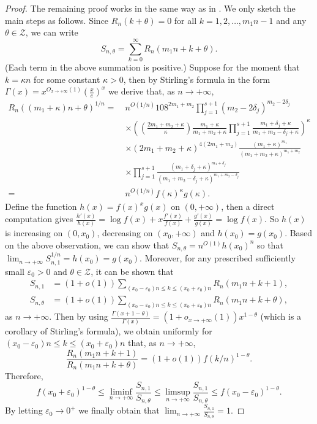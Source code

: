 \documentclass[11pt]{amsart}
\numberwithin{equation}{section}
\begin{document}
\begin{proof}
The remaining proof works in the same way as in \cite[Lemma~4.1]{LY20}. We only sketch the main steps as follows. Since $R_n(k+\theta) = 0$ for all $k=1,2,\ldots,m_{1}n-1$ and any $\theta \in \mathcal{Z}$, we can write
\[ S_{n,\theta} =  \sum_{k=0}^{\infty} R_n(m_1n+k+\theta). \]
(Each term in the above summation is positive.) Suppose for the moment that $k = \kappa n$ for some constant $\kappa > 0$, then by Stirling's formula in the form $\Gamma(x)=x^{O_{x \rightarrow+\infty}(1)}\left(\frac{x}{e}\right)^{x}$ we derive that, as $n \rightarrow +\infty$,
\begin{align*}
R_n\left( (m_1+\kappa)n+\theta \right)^{1/n} =~& n^{O(1/n)} 108^{2m_1+m_2} \prod_{j=1}^{s+1} (m_2-2\delta_j)^{m_2-2\delta_j} \\
&\times \left( \left( \frac{2m_1+m_2+\kappa}{\kappa} \right)\frac{m_1+\kappa}{m_1+m_2+\kappa} \prod_{j=1}^{s+1} \frac{m_1+\delta_j+\kappa}{m_1+m_2-\delta_j+\kappa}  \right)^{\kappa} \\
&\times (2m_1+m_2+\kappa)^{4(2m_1+m_2)}\frac{(m_1+\kappa)^{m_1}}{(m_1+m_2+\kappa)^{m_1+m_2}} \\
&\times \prod_{j=1}^{s+1}\frac{(m_1+\delta_j+\kappa)^{m_1+\delta_j}}{(m_1+m_2-\delta_j+\kappa)^{m_1+m_2-\delta_j}} \\
=~&n^{O(1/n)}f(\kappa)^{\kappa}g(\kappa).
\end{align*}
Define the function $h(x) = f(x)^{x}g(x)$ on $(0,+\infty)$, then a direct computation gives $\frac{h'(x)}{h(x)} = \log f(x) + x\frac{f'(x)}{f(x)} + \frac{g'(x)}{g(x)} = \log f(x)$. So $h(x)$ is increasing on $(0,x_0)$, decreasing on $(x_0,+\infty)$ and $h(x_0)=g(x_0)$. Based on the above observation, we can show that $S_{n,\theta} = n^{O(1)}h(x_0)^n$ so that $\lim_{n \rightarrow +\infty} S_{n,1}^{1/n} = h(x_0) = g(x_0)$. Moreover, for any prescribed sufficiently small $\varepsilon_0 > 0$ and $\theta \in \mathcal{Z}$, it can be shown that
\begin{align*}
S_{n,1} &= (1+o(1))\sum_{(x_0-\varepsilon_0)n \leqslant k \leqslant (x_0+\varepsilon_0)n} R_n(m_1n+k+1),  \\
S_{n,\theta} &= (1+o(1))\sum_{(x_0-\varepsilon_0)n \leqslant k \leqslant (x_0+\varepsilon_0)n} R_n(m_1n+k+\theta),
\end{align*}
as $n \rightarrow +\infty$. Then by using $\frac{\Gamma(x+1-\theta)}{\Gamma(x)}=\left(1+o_{x \rightarrow+\infty}(1)\right) x^{1-\theta}$ (which is a corollary of Stirling's formula), we obtain uniformly for $(x_0-\varepsilon_0)n \leqslant k \leqslant (x_0+\varepsilon_0)n$ that, as $n \rightarrow +\infty$,
\[ \frac{R_n(m_1n+k+1)}{R_n(m_1n+k+\theta)} = (1+o(1))f\left( k/n \right)^{1-\theta}. \]
Therefore,
\[ f(x_0+\varepsilon_0)^{1-\theta} \leqslant \liminf_{n \rightarrow +\infty} \frac{S_{n,1}}{S_{n,\theta}} \leqslant \limsup_{n \rightarrow +\infty} \frac{S_{n,1}}{S_{n,\theta}} \leqslant f(x_0-\varepsilon_0)^{1-\theta}. \]
By letting $\varepsilon_0 \rightarrow 0^{+}$ we finally obtain that $\lim_{n \rightarrow +\infty} \frac{S_{n,1}}{S_{n,\theta}} = 1$.
\end{proof}
\end{document}
